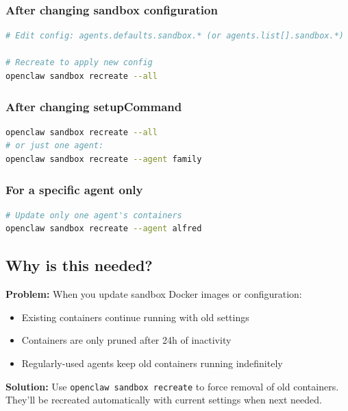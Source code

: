 \subsubsection{After changing sandbox configuration}


\begin{lstlisting}[language=bash]
# Edit config: agents.defaults.sandbox.* (or agents.list[].sandbox.*)

# Recreate to apply new config
openclaw sandbox recreate --all
\end{lstlisting}


\subsubsection{After changing setupCommand}


\begin{lstlisting}[language=bash]
openclaw sandbox recreate --all
# or just one agent:
openclaw sandbox recreate --agent family
\end{lstlisting}


\subsubsection{For a specific agent only}


\begin{lstlisting}[language=bash]
# Update only one agent's containers
openclaw sandbox recreate --agent alfred
\end{lstlisting}


\subsection{Why is this needed?}


\textbf{Problem:} When you update sandbox Docker images or configuration:

\begin{itemize}
  \item Existing containers continue running with old settings
  \item Containers are only pruned after 24h of inactivity
  \item Regularly-used agents keep old containers running indefinitely
\end{itemize}


\textbf{Solution:} Use \texttt{openclaw sandbox recreate} to force removal of old containers. They'll be recreated automatically with current settings when next needed.

